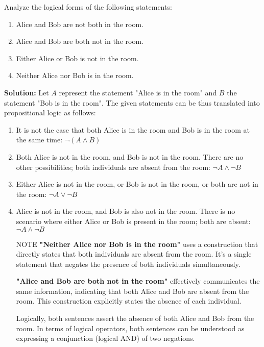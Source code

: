 Analyze the logical forms of the following statements:
\begin{enumerate}[label=(\alph*)]
    \item Alice and Bob are not both in the room.
    \item Alice and Bob are both not in the room.
    \item Either Alice or Bob is not in the room.
    \item Neither Alice nor Bob is in the room.
\end{enumerate}

\textbf{Solution:}
Let $A$ represent the statement "Alice is in the room" and $B$ the statement "Bob is in the room". The given statements can be thus translated into propositional logic as follows:

\begin{enumerate}[label=(\alph*)]
    \item It is not the case that both Alice is in the room and Bob is in the room at the same time: $\neg (A \wedge B)$
    \item Both Alice is not in the room, and Bob is not in the room. There are no other possibilities; both individuals are absent from the room: $\neg A \wedge \neg B$
    \item Either Alice is not in the room, or Bob is not in the room, or both are not in the room: $\neg A \vee \neg B$ 
    \item Alice is not in the room, and Bob is also not in the room. There is no scenario where either Alice or Bob is present in the room; both are absent: $\neg A \wedge \neg B$
\end{enumerate}

\begin{enumerate}
    \item[NOTE] \textbf{"Neither Alice nor Bob is in the room"} uses a construction that directly states that both individuals are absent from the room. It's a single statement that negates the presence of both individuals simultaneously.
    \item[] \textbf{"Alice and Bob are both not in the room"} effectively communicates the same information, indicating that both Alice and Bob are absent from the room. This construction explicitly states the absence of each individual.
    \item[] Logically, both sentences assert the absence of both Alice and Bob from the room. In terms of logical operators, both sentences can be understood as expressing a conjunction (logical AND) of two negations.
\end{enumerate}

\pagebreak